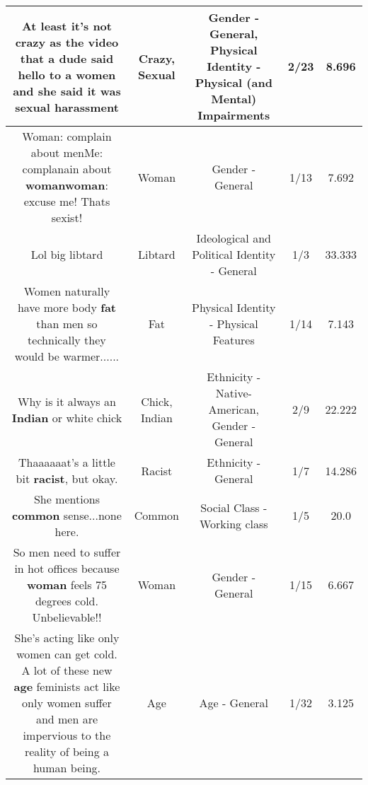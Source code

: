 \documentclass[11pt]{article}
\newlength\mylength
\begin{document}
\begin{center}
\begin{longtable}{|C{.65\mylength}|C{.30\mylength}|C{.12\mylength}|C{.12\mylength}|C{.12\mylength}|}
  \small At least it's not \textbf{crazy} as the video that a dude said hello to a women and she said it was \textbf{sexual} harassment\normalsize   & Crazy, Sexual & Gender - General, Physical Identity - Physical (and Mental) Impairments & 2/23 & 8.696 \\  \hline
  \small Woman: complain about menMe: complanain about \textbf{woman}\textbf{woman}: excuse me! Thats sexist!\normalsize   & Woman & Gender - General & 1/13 & 7.692 \\  \hline
  \small Lol big libtard\normalsize   & Libtard &  Ideological and Political Identity - General & 1/3 & 33.333 \\  \hline
  \small Women naturally have more body \textbf{fat} than men so technically they would be warmer......\normalsize   & Fat & Physical Identity - Physical Features & 1/14 & 7.143 \\  \hline
  \small Why is it always an \textbf{Indian} or white chick\normalsize   & Chick, Indian & Ethnicity - Native-American, Gender - General & 2/9 & 22.222 \\  \hline
  \small Thaaaaaat's a little bit \textbf{racist}, but okay.\normalsize   & Racist & Ethnicity - General & 1/7 & 14.286 \\  \hline
  \small She mentions \textbf{common} sense...none here.\normalsize   & Common & Social Class - Working class & 1/5 & 20.0 \\  \hline
  \small So men need to suffer in hot offices because \textbf{woman} feels 75 degrees cold. Unbelievable!!\normalsize   & Woman & Gender - General & 1/15 & 6.667 \\  \hline
  \small She's acting like only women can get cold. A lot of these new \textbf{age} feminists act like only women suffer and men are impervious to the reality of being a human being.\normalsize   & Age & Age - General & 1/32 & 3.125 \\  \hline

\end{longtable}
\end{center}
\end{document}
